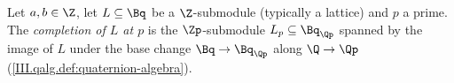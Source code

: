 Let $a,b\in\Z$, let $L\subseteq\Bq$ be a $\Z$-submodule (typically a lattice) and $p$ a prime. The \emph{completion of $L$ at $p$} is the
$\Zp$-submodule $L_p\subseteq\Bq_{\Qp}$ spanned by the image of $L$ under the base change $\Bq\to\Bq_{\Qp}$ along $\Q\to\Qp$
(\cref{III.qalg.def:quaternion-algebra}).
